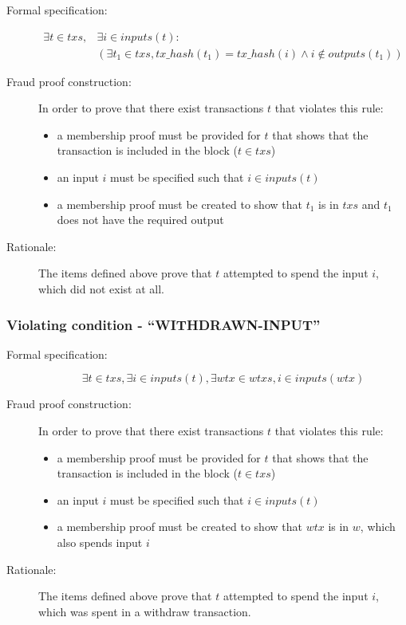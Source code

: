\documentclass[../main.tex]{subfiles}
\begin{document}
\begin{description}

\item[Formal specification:]
\begin{equation*}
\begin{split}
    \exists t \in txs, &\exists i \in inputs(t): \\
    &( \exists t_1 \in txs, tx\_hash(t_1) = tx\_hash(i) \land i \notin outputs(t_1) )
\end{split}
\end{equation*}

\item[Fraud proof construction:] In order to prove that there exist transactions $t$ that violates this rule:
\begin{itemize}
    \item a membership proof must be provided for $t$ that shows that the transaction is included in the block ($t \in txs$)
    \item an input $i$ must be specified such that $i \in inputs(t)$
    \item a membership proof must be created to show that $t_1$ is in $txs$ and $t_1$ does not have the required output
\end{itemize}

\item[Rationale:] The items defined above prove that $t$ attempted to spend the input $i$, which did not exist at all.

\end{description}

\subsubsection{Violating condition - ``WITHDRAWN-INPUT''}
\label{sec:WITHDRAWN-INPUT}

\begin{description}

\item[Formal specification:]
\begin{equation*}
    \exists t \in txs, \exists i \in inputs(t), \exists wtx \in wtxs, i \in inputs(wtx)
\end{equation*}

\item[Fraud proof construction:] In order to prove that there exist transactions $t$ that violates this rule:
\begin{itemize}
    \item a membership proof must be provided for $t$ that shows that the transaction is included in the block ($t \in txs$)
    \item an input $i$ must be specified such that $i \in inputs(t)$
    \item a membership proof must be created to show that $wtx$ is in $w$, which also spends input $i$
\end{itemize}

\item[Rationale:] The items defined above prove that $t$ attempted to spend the input $i$, which was spent in a withdraw transaction.

\end{description}
\end{document}
